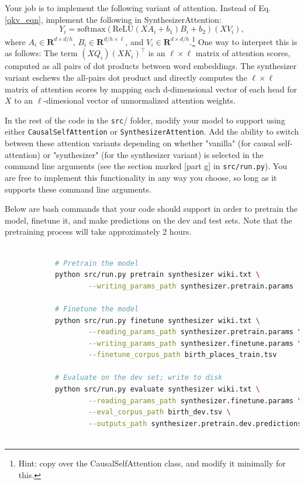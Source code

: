 \documentclass[letterpaper,12pt]{article}
\begin{document}
\begin{itemize}
		Your job is to implement the following variant of attention. Instead of Eq. \ref{qkv_eqn}, implement the
		following in SynthesizerAttention:
		\begin{equation}
			Y_i = \text{softmax}\left( \text{ReLU}(XA_i + b_1)B_i + b_2 \right)\left(XV_i\right),
		\end{equation}
		where $A_i \in \mathbf{R}^{d\times d/h}$, $B_i \in \mathbf{R}^{d/h \times \ell}$, and $V_i \in \mathbf{R}^{d \times d/h}$.\footnote{Hint: copy over the CausalSelfAttention class, and modify it minimally for this.} One way to interpret this is as follows: The term $(XQ_i)(XK_i)^\top$ is an $\ell \times \ell$ matrix of attention scores, computed as all pairs of dot products between word embeddings. The synthesizer variant eschews the all-pairs dot product and directly computes the $\ell \times \ell$ matrix of attention scores by mapping each d-dimensional vector of each head for $X$ to an $\ell$-dimesional vector of unnormalized attention weights.
		
		In the rest of the code in the \texttt{src}/ folder, modify your model to support using either \texttt{CausalSelfAttention} or \texttt{SynthesizerAttention}. Add the ability to switch between these attention variants depending on whether "vanilla" (for causal self-attention) or "synthesizer" (for the synthesizer variant) is selected in the command line arguments (see the section marked [part g] in \texttt{src/run.py}). You are free to implement this functionality in any way you choose, so long as it supports these command line arguments.
		
		Below are bash commands that your code should support in order to pretrain the model, finetune it, and make predictions on the dev and test sets.
		Note that the pretraining process will take approximately 2 hours. 
		\begin{lstlisting}[basicstyle=\ttfamily, language=bash]
			
			# Pretrain the model
			python src/run.py pretrain synthesizer wiki.txt \
					--writing_params_path synthesizer.pretrain.params
			
			# Finetune the model
			python src/run.py finetune synthesizer wiki.txt \
					--reading_params_path synthesizer.pretrain.params \
					--writing_params_path synthesizer.finetune.params \
					--finetune_corpus_path birth_places_train.tsv
			
			# Evaluate on the dev set; write to disk
			python src/run.py evaluate synthesizer wiki.txt \
					--reading_params_path synthesizer.finetune.params \
					--eval_corpus_path birth_dev.tsv \
					--outputs_path synthesizer.pretrain.dev.predictions
			

\end{lstlisting}
\end{itemize}
\end{document}
